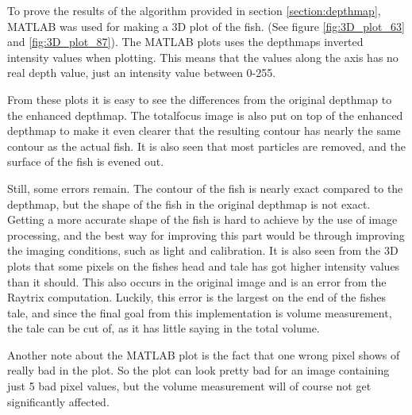 To prove the results of the algorithm provided in section \ref{section:depthmap}, MATLAB was used for making a 3D plot of the fish. (See figure \ref{fig:3D_plot_63} and \ref{fig:3D_plot_87}). The MATLAB plots uses the depthmaps inverted intensity values when plotting. This means that the values along the axis has no real depth value, just an intensity value between 0-255.\cite{website:mathworks_meshgrid}

From these plots it is easy to see the differences from the original depthmap to the enhanced depthmap. The totalfocus image is also put on top of the enhanced depthmap to make it even clearer that the resulting contour has nearly the same contour as the actual fish. It is also seen that most particles are removed, and the surface of the fish is evened out.

Still, some errors remain. The contour of the fish is nearly exact compared to the depthmap, but the shape of the fish in the original depthmap is not exact. Getting a more accurate shape of the fish is hard to achieve by the use of image processing, and the best way for improving this part would be through improving the imaging conditions, such as light and calibration. 
It is also seen from the 3D plots that some pixels on the fishes head and tale has got higher intensity values than it should.
This also occurs in the original image and is an error from the Raytrix computation. Luckily, this error is the largest on the end of the fishes tale, and since the final goal from this implementation is volume measurement, the tale can be cut of, as it has little saying in the total volume. 

Another note about the MATLAB plot is the fact that one wrong pixel shows of really bad in the plot. So the plot can look pretty bad for an image containing just 5 bad pixel values, but the volume measurement will of course not get significantly affected.


